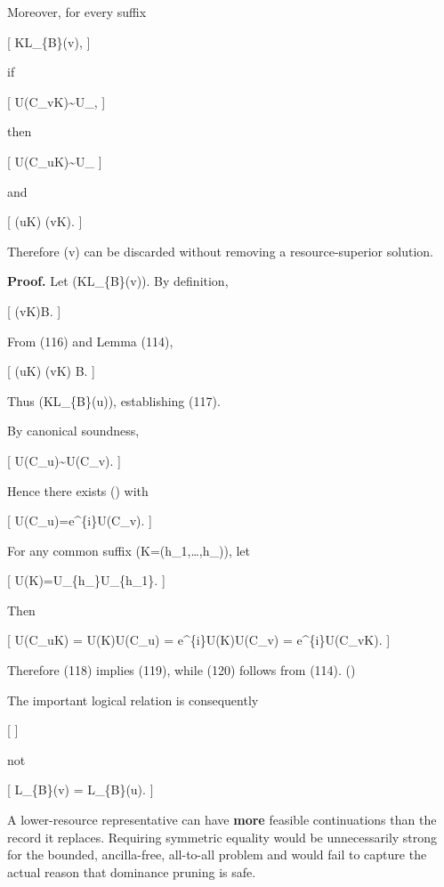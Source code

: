 \documentclass[
]{article}
\begin{document}
Moreover, for every suffix

{[} K\in\mathcal L\_\{\mathbf B\}(v), {]}

if

{[} U(C\_v\oplus K)\sim U\_\star,  {]}

then

{[} U(C\_u\oplus K)\sim U\_\star {} {]}

and

{[} \boldsymbol\rho(u\oplus K) \preceq \boldsymbol\rho(v\oplus K).
 {]}

Therefore (v) can be discarded without removing a resource-superior
solution.

\textbf{Proof.} Let (K\in\mathcal L\_\{\mathbf B\}(v)). By definition,

{[} \boldsymbol\rho(v\oplus K)\preceq\mathbf B.  {]}

From (116) and Lemma (114),

{[} \boldsymbol\rho(u\oplus K) \preceq \boldsymbol\rho(v\oplus K)
\preceq \mathbf B.  {]}

Thus (K\in\mathcal L\_\{\mathbf B\}(u)), establishing (117).

By canonical soundness,

{[} U(C\_u)\sim U(C\_v).  {]}

Hence there exists (\phi) with

{[} U(C\_u)=e\^{}\{i\phi\}U(C\_v). {]}

For any common suffix (K=(h\_1,\ldots,h\_\ell)), let

{[} U(K)=U\_\{h\_\ell\}\cdots U\_\{h\_1\}. {]}

Then

{[} U(C\_u\oplus K) = U(K)U(C\_u) = e\^{}\{i\phi\}U(K)U(C\_v) =
e\^{}\{i\phi\}U(C\_v\oplus K).  {]}

Therefore (118) implies (119), while (120) follows from (114). (\square)

The important logical relation is consequently

{[}  {]}

not

{[} \mathcal L\_\{\mathbf B\}(v) = \mathcal L\_\{\mathbf B\}(u).
 {]}

A lower-resource representative can have \textbf{more} feasible
continuations than the record it replaces. Requiring symmetric equality
would be unnecessarily strong for the bounded, ancilla-free, all-to-all
problem and would fail to capture the actual reason that dominance
pruning is safe.
\end{document}

